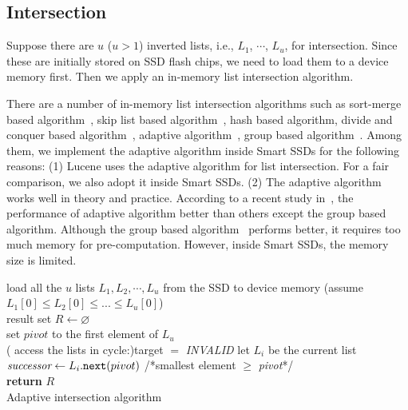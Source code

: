 \subsection{Intersection}\label{sec:intersection}
Suppose there are $u$ ($u>1$) inverted lists, i.e., $L_1$, $\cdots$, $L_u$, for intersection. Since these are initially stored on SSD flash chips, we need to load them to a device memory first. Then we apply an in-memory list intersection algorithm.

There are a number of in-memory list intersection algorithms such as sort-merge based algorithm~\cite{GarciaMolina2008}, skip list based algorithm~\cite{M08}, hash based algorithm, divide and conquer based algorithm~\cite{Baezayates05}, adaptive algorithm~\cite{Demaine2000ASI,DLMI01}, group based algorithm~\cite{Ding2011}. Among them, we implement the adaptive algorithm inside Smart SSDs for the following reasons: (1) Lucene uses the adaptive algorithm for list intersection. For a fair comparison, we also adopt it inside Smart SSDs. (2) The adaptive algorithm works well in theory and practice. According to a recent study in~\cite{Ding2011}, the performance of adaptive algorithm better than others except the group based algorithm. Although the group based algorithm~\cite{Ding2011} performs better, it requires too much memory for pre-computation. However, inside Smart SSDs, the memory size is limited.


 \begin{algorithm}[tbp]\small
load all the $u$ lists $L_1, L_2, \cdots, L_u$ from the SSD to device memory (assume $L_1[0] \le L_2[0] \le ... \le L_u[0]$)\\
result set $R \leftarrow \varnothing$\\
set $pivot$ to the first element of $L_u$ \\

 \Repeat( access the lists in cycle:){target $=$ \emph{INVALID}}{
 let $L_i$ be the current list \\
 $\emph{successor} \leftarrow L_i.\texttt{next}(pivot)$ /*smallest element $\ge$ \emph{pivot}*/\\
 }
 \textbf{return} $R$\\
 \caption{Adaptive intersection algorithm}\label{alg:AdaptiveIntersection}
 \end{algorithm}


